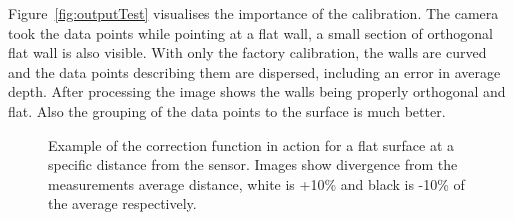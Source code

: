 \documentclass[]{article}
\begin{document}
{ Figure~\ref{fig:outputTest} visualises the importance of the calibration. The camera took the data points while pointing at a flat wall, a small section of orthogonal flat wall is also visible. With only the factory calibration, the walls are curved and the data points describing them are dispersed, including an error in average depth. After processing the image shows the walls being properly orthogonal and flat. Also the grouping of the data points to the surface is much better.


\begin{figure}[htb]
	\centering     %
	 \;
	\caption{Example of the correction function in action for a flat surface at a specific distance from the sensor. Images show divergence from the measurements average distance, white is +10\% and black is -10\% of the average respectively.}
	\label{fig:beforeAfter}
\end{figure}
\begin{figure}[htb]
	\centering     %
	 \;

\end{figure}}
\end{document}
